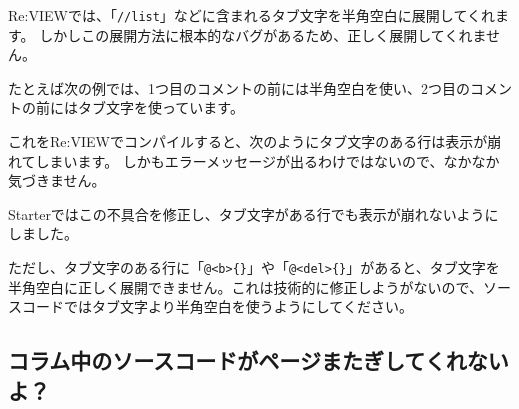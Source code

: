 Re:VIEWでは、「\texttt{//list}」などに含まれるタブ文字を半角空白に展開してくれます。
しかしこの展開方法に根本的なバグがあるため、正しく展開してくれません。

たとえば次の例では、1つ目のコメントの前には半角空白を使い、2つ目のコメントの前にはタブ文字を使っています。

\begin{starterprogram}\end{starterprogram}

これをRe:VIEWでコンパイルすると、次のようにタブ文字のある行は表示が崩れてしまいます。
しかもエラーメッセージが出るわけではないので、なかなか気づきません。

\noindent
{}

\starterresult
\begin{starterterminal}\end{starterterminal}
\endstarterresult

Starterではこの不具合を修正し、タブ文字がある行でも表示が崩れないようにしました。

\noindent
{}

\starterresult
\begin{starterterminal}\end{starterterminal}
\endstarterresult

ただし、タブ文字のある行に「\texttt{@\textless{}b\textgreater{}\{\}}」や「\texttt{@\textless{}del\textgreater{}\{\}}」があると、タブ文字を半角空白に正しく展開できません。これは技術的に修正しようがないので、ソースコードではタブ文字より半角空白を使うようにしてください。

\subsection*{コラム中のソースコードがページまたぎしてくれないよ？}
\label{sec:2-4-2}

